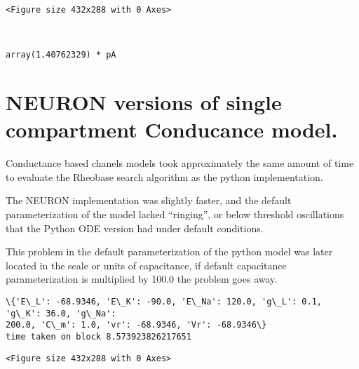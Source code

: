 \documentclass[11pt]{article}
\begin{document}
    
    \begin{verbatim}
<Figure size 432x288 with 0 Axes>
    \end{verbatim}

    
    \begin{center}
    \end{center}
    { \hspace*{\fill} \\}
    
            \begin{tcolorbox}[breakable, size=fbox, boxrule=.5pt, pad at break*=1mm, opacityfill=0]
\begin{Verbatim}[commandchars=\\\{\}]
array(1.40762329) * pA
\end{Verbatim}
\end{tcolorbox}
        
    \hypertarget{neuron-versions-of-single-compartment-conducance-model.}{%
\section{NEURON versions of single compartment Conducance
model.}\label{neuron-versions-of-single-compartment-conducance-model.}}

Conductance based chanels models took approximately the same amount of
time to evaluate the Rheobase search algorithm as the python
implementation.

The NEURON implementation was slightly faster, and the default
parameterization of the model lacked ``ringing'', or below threshold
oscillations that the Python ODE version had under default conditions.

This problem in the default parameterization of the python model was
later located in the scale or units of capacitance, if default
capacitance parameterization is multiplied by 100.0 the problem goes
away.

    \begin{Verbatim}[commandchars=\\\{\}]
\{'E\_L': -68.9346, 'E\_K': -90.0, 'E\_Na': 120.0, 'g\_L': 0.1, 'g\_K': 36.0, 'g\_Na':
200.0, 'C\_m': 1.0, 'vr': -68.9346, 'Vr': -68.9346\}
time taken on block 8.573923826217651
    \end{Verbatim}

    
    \begin{verbatim}
<Figure size 432x288 with 0 Axes>
    \end{verbatim}
\end{document}
